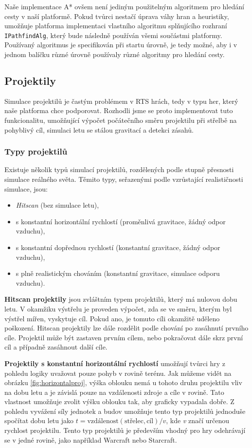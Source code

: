 Naše implementace A* ovšem není jediným použitelným algoritmem pro hledání cesty v naší platformě. Pokud tvůrci nestačí úprava váhy hran a heuristiky, umožňuje platforma implementaci vlastního algoritmu splňujícího rozhraní \texttt{IPathfindAlg}, který bude následně používán všemi součástmi platformy. Používaný algoritmus je specifikován při startu úrovně, je tedy možné, aby i v jednom balíčku různé úrovně používaly různé algoritmy pro hledání cesty.

\subsection{Projektily}
Simulace projektilů je častým problémem v RTS hrách, tedy v typu her, který naše platforma chce podporovat. Rozhodli jsme se proto implementovat tuto funkcionalitu, umožňující výpočet počátečního směru projektilu při střelbě na pohyblivý cíl, simulaci letu se stálou gravitací a detekci zásahů. 

\subsubsection{Typy projektilů}
Existuje několik typů simulací projektilů, rozdělených podle stupně přesnosti simulace reálného světa. Těmito typy, seřazenými podle vzrůstající realističnosti simulace, jsou:
\begin{itemize}
	\item \textit{Hitscan} (bez simulace letu),
	\item s konstantní horizontální rychlostí (proměnlivá gravitace, žádný odpor vzduchu),
	\item s konstantní dopřednou rychlostí (konstantní gravitace, žádný odpor vzduchu),
	\item s plně realistickým chováním (konstantní gravitace, simulace odporu vzduchu).
\end{itemize}

\textbf{Hitscan projektily} jsou zvláštním typem projektilů, který má nulovou dobu letu. V okamžiku výstřelu je proveden výpočet, zda se ve směru, kterým byl výstřel mířen, vyskytuje cíl. Pokud ano, je tomuto cíli okamžitě uděleno poškození. Hitscan projektily lze dále rozdělit podle chování po zasáhnutí prvního cíle. Projektil může být zastaven prvním cílem, nebo pokračovat dále skrz první cíl a případně zasáhnout další cíle.

\textbf{Projektily s konstantní horizontální rychlostí} umožňují tvůrci hry z pohledu logiky uvažovat pouze pohyb v rovině terénu. Jak můžeme vidět na obrázku \ref{fig:horizontalproj}, výška oblouku nemá u tohoto druhu projektilu vliv na dobu letu a je závislá pouze na vzdálenosti zdroje a cíle v rovině. Tato vlastnost umožňuje zvolit výšku oblouku tak, aby graficky vypadala dobře. Z pohledu vyvážení síly jednotek a budov umožňuje tento typ projektilů jednoduše spočítat dobu letu jako \( t=\text{vzdálenost}(\text{střelec}, \text{cíl}) / v \), kde \textit{v} značí určenou rychlost projektilu. Tento typ projektilů je především vhodný pro hry odehrávají se v jedné rovině, jako například Warcraft nebo Starcraft.

